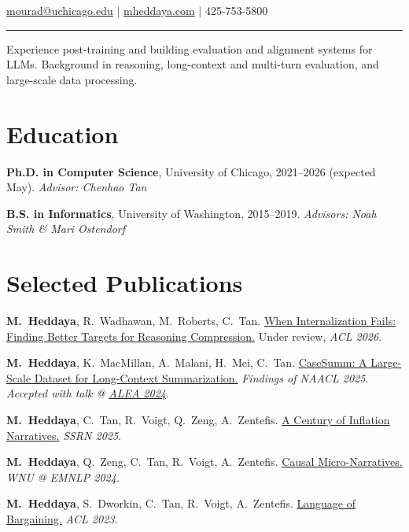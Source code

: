 \documentclass[11pt,letterpaper]{article}
\begin{document}
\hfill{\normalsize \href{mailto:mourad@uchicago.edu}{mourad@uchicago.edu} $|$ \href{https://mheddaya.com}{mheddaya.com} $|$ 425-753-5800}
\vspace{2pt}
\hrule

\vspace{12pt}
\noindent Experience post-training and building evaluation and alignment systems for LLMs.
Background in reasoning, long-context and multi-turn evaluation, and large-scale data processing.

\section*{Education}

\noindent\textbf{Ph.D. in Computer Science}, University of Chicago, 2021--2026 (expected May). \textit{Advisor: Chenhao Tan}

\vspace{4pt}

\noindent\textbf{B.S. in Informatics}, University of Washington, 2015--2019. \textit{Advisors: Noah Smith \& Mari Ostendorf}

\section*{Selected Publications}
\vspace{4pt}
\begin{enumerate}[label={[\arabic*]}, leftmargin=2em, topsep=2pt, itemsep=1pt, parsep=0pt]
    \item \textbf{M.\ Heddaya}, R.\ Wadhawan, M.\ Roberts, C.\ Tan. \href{https://mheddaya.com/papers/acl2026_abridge.pdf}{When Internalization Fails: Finding Better Targets for Reasoning Compression.} Under review, \textit{ACL 2026}.
    \item \textbf{M.\ Heddaya}, K.\ MacMillan, A.\ Malani, H.\ Mei, C.\ Tan. \href{https://arxiv.org/abs/2501.00097}{CaseSumm: A Large-Scale Dataset for Long-Context Summarization.} \textit{Findings of NAACL 2025}. \textit{Accepted with talk @ \href{https://www.amlecon.org}{ALEA 2024}}.
    \item \textbf{M.\ Heddaya}, C.\ Tan, R.\ Voigt, Q.\ Zeng, A.\ Zentefis. \href{https://papers.ssrn.com/sol3/papers.cfm?abstract_id=5259107}{A Century of Inflation Narratives.} \textit{SSRN 2025}.
    \item \textbf{M.\ Heddaya}, Q.\ Zeng, C.\ Tan, R.\ Voigt, A.\ Zentefis. \href{https://aclanthology.org/2024.wnu-1.12/}{Causal Micro-Narratives.} \textit{WNU @ EMNLP 2024}.
    \item \textbf{M.\ Heddaya}, S.\ Dworkin, C.\ Tan, R.\ Voigt, A.\ Zentefis. \href{https://aclanthology.org/2023.acl-long.735/}{Language of Bargaining.} \textit{ACL 2023}.
\end{enumerate}
\end{document}
